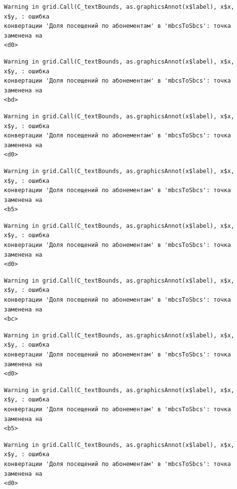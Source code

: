 \documentclass[
  letterpaper,
  DIV=11,
  numbers=noendperiod]{scrreprt}
\begin{document}
\begin{verbatim}
Warning in grid.Call(C_textBounds, as.graphicsAnnot(x$label), x$x, x$y, : ошибка
конвертации 'Доля посещений по абонементам' в 'mbcsToSbcs': точка заменена на
<d0>
\end{verbatim}

\begin{verbatim}
Warning in grid.Call(C_textBounds, as.graphicsAnnot(x$label), x$x, x$y, : ошибка
конвертации 'Доля посещений по абонементам' в 'mbcsToSbcs': точка заменена на
<bd>
\end{verbatim}

\begin{verbatim}
Warning in grid.Call(C_textBounds, as.graphicsAnnot(x$label), x$x, x$y, : ошибка
конвертации 'Доля посещений по абонементам' в 'mbcsToSbcs': точка заменена на
<d0>
\end{verbatim}

\begin{verbatim}
Warning in grid.Call(C_textBounds, as.graphicsAnnot(x$label), x$x, x$y, : ошибка
конвертации 'Доля посещений по абонементам' в 'mbcsToSbcs': точка заменена на
<b5>
\end{verbatim}

\begin{verbatim}
Warning in grid.Call(C_textBounds, as.graphicsAnnot(x$label), x$x, x$y, : ошибка
конвертации 'Доля посещений по абонементам' в 'mbcsToSbcs': точка заменена на
<d0>
\end{verbatim}

\begin{verbatim}
Warning in grid.Call(C_textBounds, as.graphicsAnnot(x$label), x$x, x$y, : ошибка
конвертации 'Доля посещений по абонементам' в 'mbcsToSbcs': точка заменена на
<bc>
\end{verbatim}

\begin{verbatim}
Warning in grid.Call(C_textBounds, as.graphicsAnnot(x$label), x$x, x$y, : ошибка
конвертации 'Доля посещений по абонементам' в 'mbcsToSbcs': точка заменена на
<d0>
\end{verbatim}

\begin{verbatim}
Warning in grid.Call(C_textBounds, as.graphicsAnnot(x$label), x$x, x$y, : ошибка
конвертации 'Доля посещений по абонементам' в 'mbcsToSbcs': точка заменена на
<b5>
\end{verbatim}

\begin{verbatim}
Warning in grid.Call(C_textBounds, as.graphicsAnnot(x$label), x$x, x$y, : ошибка
конвертации 'Доля посещений по абонементам' в 'mbcsToSbcs': точка заменена на
<d0>
\end{verbatim}
\end{document}
